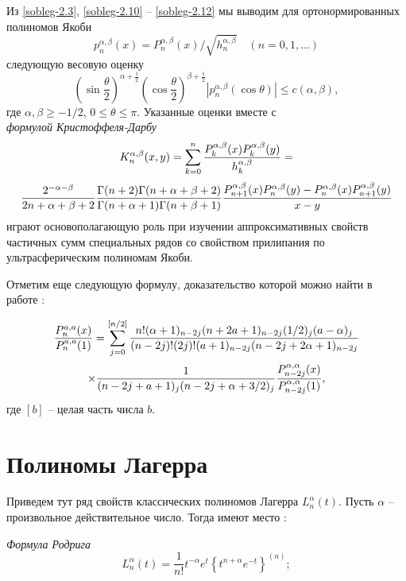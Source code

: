 Из \eqref{sobleg-2.3}, \eqref{sobleg-2.10} -- \eqref{sobleg-2.12} мы выводим для ортонормированных   полиномов Якоби
\begin{equation}\label{sobleg-2.13}
p_n^{\alpha,\beta}(x)=P_n^{\alpha,\beta}(x)/\sqrt{h_n^{\alpha,\beta}}\quad(n=0,1,\ldots)
\end{equation}
 следующую весовую оценку
\begin{equation}\label{sobleg-2.14}
\left(\sin\frac{\theta}{2}\right)^{\alpha+\frac12}
\left(\cos\frac{\theta}{2}\right)^{\beta+\frac12}
|p_n^{\alpha,\beta}(\cos\theta)|\le c(\alpha,\beta),
\end{equation}
где $\alpha,\beta\ge-1/2$, $0\le\theta\le\pi$. Указанные оценки вместе с \\
\textit{ формулой Кристоффеля-Дарбу }
$$
 K_n^{\alpha,\beta}(x,y)=
\sum_{k=0}^n{P_k^{\alpha,\beta}(x)P_k^{\alpha,\beta}(y)\over
h_k^{\alpha,\beta}}=
 $$
\begin{equation}\label{sobleg-2.15}
 {2^{-\alpha-\beta}\over
2n+\alpha+\beta+2} {\Gamma(n+2)\Gamma(n+\alpha+\beta+2)\over
\Gamma(n+\alpha+1)\Gamma(n+\beta+1)}
 {P_{n+1}^{\alpha,\beta}(x)P_n^{\alpha,\beta}(y)-
P_n^{\alpha,\beta}(x)P_{n+1}^{\alpha,\beta}(y)\over x-y}
\end{equation}
играют основополагающую роль при изучении аппроксимативных свойств частичных сумм специальных рядов со свойством прилипания по ультрасферическим полиномам Якоби.

Отметим еще следующую формулу, доказательство которой можно найти в работе \cite{sobleg-Gasper}:


$$
{P_n^{a,a}(x)\over P_n^{a,a}(1)}=\sum_{j=0}^{[n/2]}
   { n!(\alpha+1)_{n-2j}(n+2a+1)_{n-2j}(1/2)_j(a-\alpha)_j
    \over (n-2j)!(2j)!(a+1)_{n-2j}(n-2j+2\alpha+1)_{n-2j}}
     $$
\begin{equation}\label{sobleg-2.15}
    \times{1\over (n-2j+a+1)_j(n-2j+\alpha+3/2)_j}
     {P_{n-2j}^{\alpha,\alpha}(x)\over
P_{n-2j}^{\alpha,\alpha}(1)},
\end{equation}
где $[b]$ -- целая часть числа $b$.

\section{Полиномы Лагерра}
Приведем тут ряд свойств классических полиномов Лагерра $L_n^{\alpha}(t)$. Пусть $\alpha$ -- произвольное действительное число. Тогда  имеют место \cite{laplas-Sege}:

\textit{Формула Родрига}
\begin{equation}\label{laplas-2.1}
L_n^{\alpha}(t) = \frac{1}{n!}t^{-\alpha}e^{t} \left\{ t^{n+\alpha} e^{-t} \right\}^{(n)};
\end{equation}

